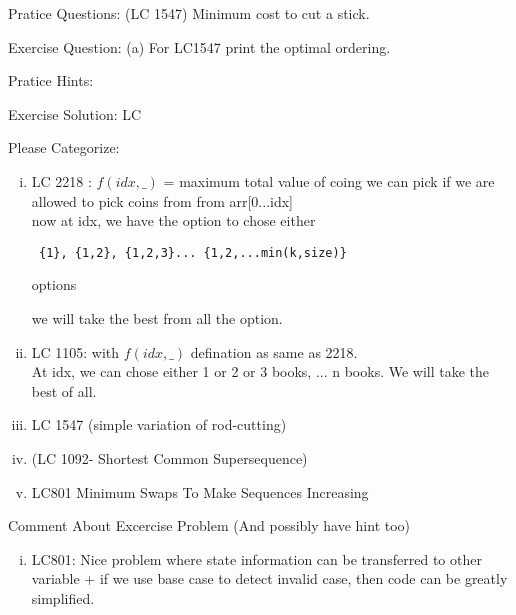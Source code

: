 







\vspace{3cm}

Pratice Questions:
(LC 1547) Minimum cost to cut a stick.

Exercise Question:
(a) For LC1547 print the optimal ordering.

Pratice Hints:


Exercise Solution:
LC

Please Categorize:
\begin{enumerate}[(i)]
    \item 
     LC 2218 : $f(idx,\_)$ = maximum total value of coing we can pick if we are allowed to pick coins from from arr[0...idx]\\
     now at idx, we have the option to chose either \begin{verbatim} {1}, {1,2}, {1,2,3}... {1,2,...min(k,size)} \end{verbatim} options
        
     we will take the best from all the option.
    
     \item LC 1105: with $f(idx,\_)$ defination as same as 2218.\\
     At idx, we can chose either 1 or 2 or 3 books, ... n books. We will take the best of all.

     \item LC 1547 (simple variation of rod-cutting)
     \item (LC 1092- Shortest Common Supersequence)
     \item LC801 Minimum Swaps To Make Sequences Increasing 
\end{enumerate}

\vspace{5cm}
Comment About Excercise Problem (And possibly have hint too)
\begin{enumerate}[(i)]
    \item LC801: Nice problem where state information can be transferred to other variable + if we use base case to detect invalid case, then code can be greatly simplified.
\end{enumerate}
